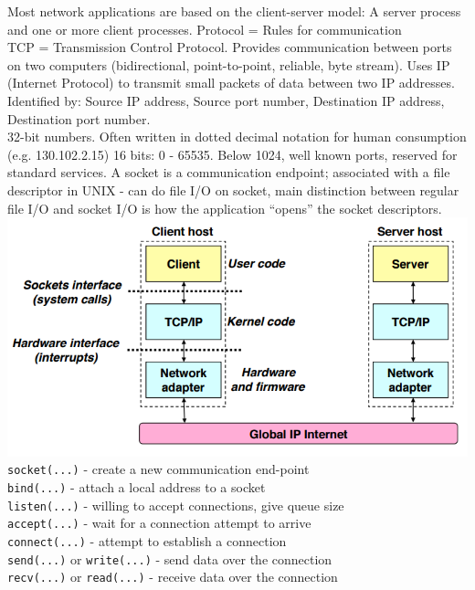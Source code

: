 \documentclass[number]{notes}
\begin{document}
\begin{landscape}
\begin{multicols}{3}
Most network applications are based on the client-server model: A server process and one or more client processes.
Protocol = Rules for communication\\
TCP = Transmission Control Protocol. Provides communication between ports on two computers (bidirectional, point-to-point, reliable, byte stream). Uses IP (Internet Protocol) to transmit small packets of data between two IP addresses.
Identified by: Source IP address, Source port number, Destination IP address, Destination port number.\\
32-bit numbers. Often written in dotted decimal notation for human consumption (e.g. 130.102.2.15)
16 bits: 0 - 65535. Below 1024, well known ports, reserved for standard services.
A socket is a communication endpoint; associated with a file descriptor in UNIX - can do file I/O on socket, main distinction between regular file I/O and socket I/O is how the application ``opens'' the socket descriptors.
\includegraphics[width=\linewidth]{sockets.png}
\texttt{socket(...)} - create a new communication end-point\\
\texttt{bind(...)} - attach a local address to a socket\\
\texttt{listen(...)} - willing to accept connections, give queue size\\
\texttt{accept(...)} - wait for a connection attempt to arrive\\
\texttt{connect(...)} - attempt to establish a connection\\
\texttt{send(...)} or \texttt{write(...)} - send data over the connection\\
\texttt{recv(...)} or \texttt{read(...)} - receive data over the connection\\

\end{multicols}
\end{landscape}
\end{document}
